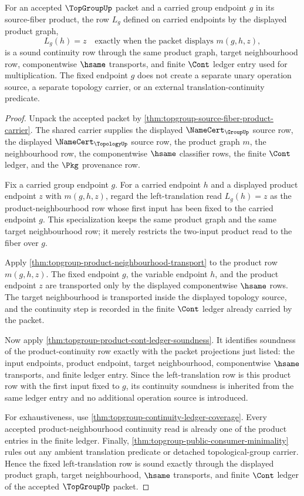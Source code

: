 \begin{theorem}
\label{thm:topgroup-fixed-left-translation-continuity-row}
For an accepted $\TopGroupUp$ packet and a carried group endpoint $g$ in its
source-fiber product, the row $L_g$ defined on carried endpoints by the displayed
product graph,
$$
L_g(h)=z \quad \text{exactly when the packet displays } m(g,h,z),
$$
is a sound continuity row through the same product graph, target neighbourhood
row, componentwise $\hsame$ transports, and finite $\Cont$ ledger entry used for
multiplication. The fixed endpoint $g$ does not create a separate unary operation
source, a separate topology carrier, or an external translation-continuity
predicate.
\end{theorem}
\begin{proof}
Unpack the accepted packet by
\autoref{thm:topgroup-source-fiber-product-carrier}. The shared carrier supplies
the displayed $\NameCert_{\GroupUp}$ source row, the displayed
$\NameCert_{\TopologyUp}$ source row, the product graph $m$, the neighbourhood
row, the componentwise $\hsame$ classifier rows, the finite $\Cont$ ledger, and
the $\Pkg$ provenance row.

Fix a carried group endpoint $g$. For a carried endpoint $h$ and a displayed
product endpoint $z$ with $m(g,h,z)$, regard the left-translation read $L_g(h)=z$
as the product-neighbourhood row whose first input has been fixed to the carried
endpoint $g$. This specialization keeps the same product graph and the same
target neighbourhood row; it merely restricts the two-input product read to the
fiber over $g$.

Apply \autoref{thm:topgroup-product-neighbourhood-transport} to the product row
$m(g,h,z)$. The fixed endpoint $g$, the variable endpoint $h$, and the product
endpoint $z$ are transported only by the displayed componentwise $\hsame$ rows.
The target neighbourhood is transported inside the displayed topology source,
and the continuity step is recorded in the finite $\Cont$ ledger already carried
by the packet.

Now apply \autoref{thm:topgroup-product-cont-ledger-soundness}. It identifies
soundness of the product-continuity row exactly with the packet projections just
listed: the input endpoints, product endpoint, target neighbourhood,
componentwise $\hsame$ transports, and finite ledger entry. Since the
left-translation row is this product row with the first input fixed to $g$, its
continuity soundness is inherited from the same ledger entry and no additional
operation source is introduced.

For exhaustiveness, use \autoref{thm:topgroup-continuity-ledger-coverage}. Every
accepted product-neighbourhood continuity read is already one of the product
entries in the finite ledger. Finally,
\autoref{thm:topgroup-public-consumer-minimality} rules out any ambient
translation predicate or detached topological-group carrier. Hence the fixed
left-translation row is sound exactly through the displayed product graph,
target neighbourhood, $\hsame$ transports, and finite $\Cont$ ledger of the
accepted $\TopGroupUp$ packet.
\end{proof}
